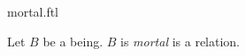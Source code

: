 \documentclass{stex}
\begin{document}
\begin{smodule}{mortal.ftl}



\begin{signature*}[forthel,for=mortal]
  Let $B$ be a being.
  $B$ is \emph{mortal} is a relation.
\end{signature*}

\end{smodule}
\end{document}
